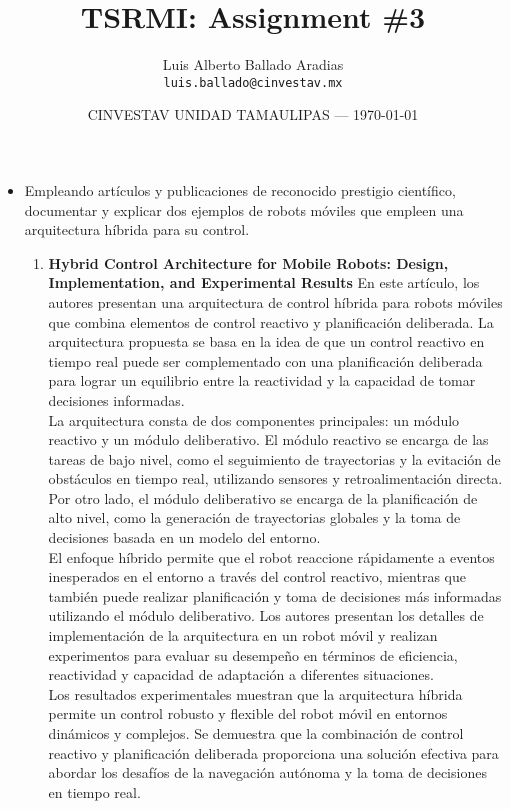 \documentclass{article}
\title{TSRMI: Assignment \#3} %
\author{Luis Alberto Ballado Aradias\\ \texttt{luis.ballado@cinvestav.mx}} %
\date{CINVESTAV UNIDAD TAMAULIPAS --- \today} %
\begin{document}
\maketitle %


\begin{itemize}

\item{Empleando artículos y publicaciones de reconocido prestigio científico, documentar y explicar dos ejemplos de robots móviles que empleen una arquitectura híbrida para su control.}

  \begin{enumerate}
  \item \textbf{Hybrid Control Architecture for Mobile Robots: Design, Implementation, and Experimental Results}
    En este artículo, los autores presentan una arquitectura de control híbrida para robots móviles que combina elementos de control reactivo y planificación deliberada. La arquitectura propuesta se basa en la idea de que un control reactivo en tiempo real puede ser complementado con una planificación deliberada para lograr un equilibrio entre la reactividad y la capacidad de tomar decisiones informadas.\\

    La arquitectura consta de dos componentes principales: un módulo reactivo y un módulo deliberativo. El módulo reactivo se encarga de las tareas de bajo nivel, como el seguimiento de trayectorias y la evitación de obstáculos en tiempo real, utilizando sensores y retroalimentación directa. Por otro lado, el módulo deliberativo se encarga de la planificación de alto nivel, como la generación de trayectorias globales y la toma de decisiones basada en un modelo del entorno.\\

    El enfoque híbrido permite que el robot reaccione rápidamente a eventos inesperados en el entorno a través del control reactivo, mientras que también puede realizar planificación y toma de decisiones más informadas utilizando el módulo deliberativo. Los autores presentan los detalles de implementación de la arquitectura en un robot móvil y realizan experimentos para evaluar su desempeño en términos de eficiencia, reactividad y capacidad de adaptación a diferentes situaciones.\\
    Los resultados experimentales muestran que la arquitectura híbrida permite un control robusto y flexible del robot móvil en entornos dinámicos y complejos. Se demuestra que la combinación de control reactivo y planificación deliberada proporciona una solución efectiva para abordar los desafíos de la navegación autónoma y la toma de decisiones en tiempo real.
    

\end{enumerate}
\end{itemize}
\end{document}
